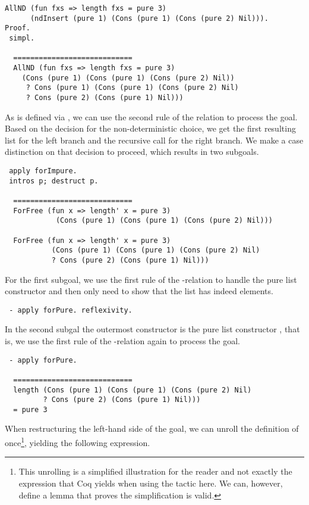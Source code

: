 \begin{verbatim}
AllND (fun fxs => length fxs = pure 3)
      (ndInsert (pure 1) (Cons (pure 1) (Cons (pure 2) Nil))).
Proof.
 simpl.

  ============================
  AllND (fun fxs => length fxs = pure 3)
    (Cons (pure 1) (Cons (pure 1) (Cons (pure 2) Nil))
     ? Cons (pure 1) (Cons (pure 1) (Cons (pure 2) Nil)
     ? Cons (pure 2) (Cons (pure 1) Nil)))
 \end{verbatim}

As  is defined via , we can use the second
rule of the relation to process the goal.
Based on the decision for the non-deterministic choice, we get the
first resulting list for the left branch and the recursive call for
the right branch.
We make a case distinction on that decision to proceed, which results
in two subgoals.

\begin{verbatim}
 apply forImpure.
 intros p; destruct p.

  ============================
  ForFree (fun x => length' x = pure 3)
            (Cons (pure 1) (Cons (pure 1) (Cons (pure 2) Nil)))

  ForFree (fun x => length' x = pure 3)
           (Cons (pure 1) (Cons (pure 1) (Cons (pure 2) Nil)
           ? Cons (pure 2) (Cons (pure 1) Nil)))
\end{verbatim}

For the first subgoal, we use the first rule of the
-relation to handle the pure list constructor and then
only need to show that the list has indeed  elements.

\begin{verbatim}
 - apply forPure. reflexivity.
\end{verbatim}

In the second subgal the outermost constructor is the pure list
constructor , that is, we use the first rule of the
-relation again to process the goal.

\begin{verbatim}
 - apply forPure.

  ============================
  length (Cons (pure 1) (Cons (pure 1) (Cons (pure 2) Nil)
         ? Cons (pure 2) (Cons (pure 1) Nil)))
  = pure 3
\end{verbatim}

When restructuring the left-hand side of the goal, we can unroll the
definition of  once\footnote{This unrolling is a
  simplified illustration for the reader and not exactly the
  expression that Coq yields when using the tactic 
  here. We can, however, define a lemma that proves the simplification
is valid.}, yielding the following expression.

